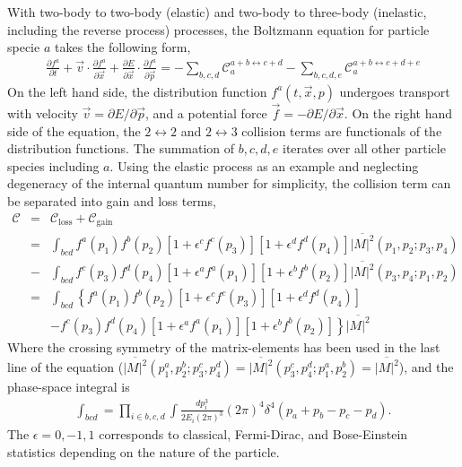 With two-body to two-body (elastic) and two-body to three-body (inelastic, including the reverse process) processes, the Boltzmann equation for particle specie $a$ takes the following form,
\begin{eqnarray}
\frac{\partial f^a}{\partial t} + \vec{v}\cdot\frac{\partial f^a}{\partial \vec{x}} + \frac{\partial E}{\partial \vec{x}}\cdot\frac{\partial f^{a}}{\partial \vec{p}} = - \sum_{b,c,d}\mathcal{C}_a^{a+b\leftrightarrow c+d}- \sum_{b,c,d,e}\mathcal{C}_a^{a+b\leftrightarrow c+d+e}
\end{eqnarray}
On the left hand side, the distribution function $f^{a}(t, \vec{x}, p)$ undergoes transport with velocity $\vec{v} = \partial E/\partial \vec{p}$, and a potential force $\vec{f} = -\partial E/\partial \vec{x}$.
On the right hand side of the equation, the $2\leftrightarrow 2$ and $2\leftrightarrow 3$ collision terms are functionals of the distribution functions.
The summation of $b,c,d,e$ iterates over all other particle species including $a$.
Using the elastic process as an example and neglecting degeneracy of the internal quantum number for simplicity, the collision term can be separated into gain and loss terms,
\begin{eqnarray}
\mathcal{C} &=& \mathcal{C}_\textrm{loss} + \mathcal{C}_\textrm{gain}\\
&=& \int_{bcd} f^a(p_1)f^b(p_2)[1+\epsilon^c f^c(p_3)][1+\epsilon^d f^d(p_4)] \overline{|M|^2}(p_1, p_2; p_3, p_4) \\\nonumber
&-& \int_{bcd} f^c(p_3)f^d(p_4)[1+\epsilon^a f^a(p_1)][1+\epsilon^b f^b(p_2)] \overline{|M|^2}(p_3, p_4; p_1, p_2) \\
&=& \int_{bcd} \left\{
f^a(p_1)f^b(p_2)[1+\epsilon^c f^c(p_3)][1+\epsilon^d f^d(p_4)] \right. \label{eq:collision-term:symmetry} \\\nonumber
&& \left.- f^c(p_3)f^d(p_4)[1+\epsilon^a f^a(p_1)][1+\epsilon^b f^b(p_2)]\right\}
\overline{|M|^2}
\end{eqnarray}
Where the crossing symmetry of the matrix-elements has been used in the last line of the equation ($\overline{|M|^2}(p_1^a, p_2^b; p_3^c, p_4^d) = \overline{|M|^2}(p_3^c, p_4^d; p_1^a, p_2^b) = \overline{|M|^2}$), and the phase-space integral is 
\begin{eqnarray}
\int_{bcd} = \prod_{i\in {b,c,d}}\int\frac{dp_i^3}{2E_i (2\pi)^3} (2\pi)^4 \delta^{4}(p_a+p_b - p_c-p_d).
\end{eqnarray}
The $\epsilon = 0, -1, 1$ corresponds to classical, Fermi-Dirac, and Bose-Einstein statistics depending on the nature of the particle.
